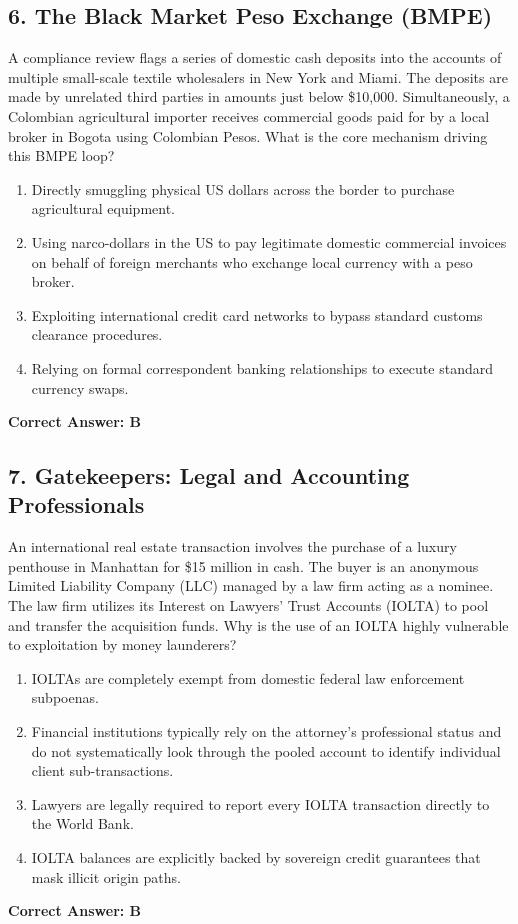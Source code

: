 \documentclass[11pt,a4paper]{article}
\begin{document}
	\subsection{6. The Black Market Peso Exchange (BMPE)}
	A compliance review flags a series of domestic cash deposits into the accounts of multiple small-scale textile wholesalers in New York and Miami. The deposits are made by unrelated third parties in amounts just below \$10,000. Simultaneously, a Colombian agricultural importer receives commercial goods paid for by a local broker in Bogota using Colombian Pesos. What is the core mechanism driving this BMPE loop?
	\begin{enumerate}[label=\Alph*.]
		\item Directly smuggling physical US dollars across the border to purchase agricultural equipment.
		\item Using narco-dollars in the US to pay legitimate domestic commercial invoices on behalf of foreign merchants who exchange local currency with a peso broker.
		\item Exploiting international credit card networks to bypass standard customs clearance procedures.
		\item Relying on formal correspondent banking relationships to execute standard currency swaps.
	\end{enumerate}
	\textbf{Correct Answer: B}
	
	\subsection{7. Gatekeepers: Legal and Accounting Professionals}
	An international real estate transaction involves the purchase of a luxury penthouse in Manhattan for \$15 million in cash. The buyer is an anonymous Limited Liability Company (LLC) managed by a law firm acting as a nominee. The law firm utilizes its Interest on Lawyers' Trust Accounts (IOLTA) to pool and transfer the acquisition funds. Why is the use of an IOLTA highly vulnerable to exploitation by money launderers?
	\begin{enumerate}[label=\Alph*.]
		\item IOLTAs are completely exempt from domestic federal law enforcement subpoenas.
		\item Financial institutions typically rely on the attorney's professional status and do not systematically look through the pooled account to identify individual client sub-transactions.
		\item Lawyers are legally required to report every IOLTA transaction directly to the World Bank.
		\item IOLTA balances are explicitly backed by sovereign credit guarantees that mask illicit origin paths.
	\end{enumerate}
	\textbf{Correct Answer: B}
	
\end{document}
